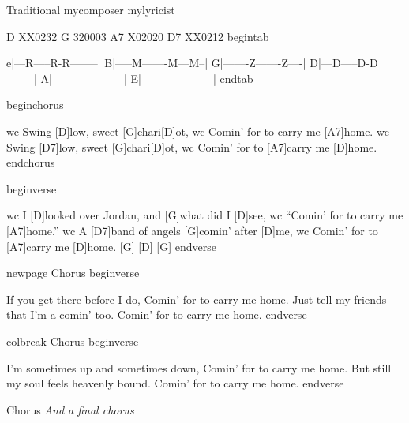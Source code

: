 
Traditional
mycomposer
mylyricist

D XX0232
G 320003
A7 X02020
D7 XX0212
begintab

e|---R-----R-R--------|
B|-----M-------M---M--|
G|-------Z-------Z----|
D|---D-----D-D--------|
A|--------------------|
E|--------------------|
endtab

beginchorus

wc Swing [D]low, sweet [G]chari[D]ot,
wc Comin{\textquoteright} for to carry me [A7]home.
wc Swing [D7]low, sweet [G]chari[D]ot,
wc Comin{\textquoteright} for to [A7]carry me [D]home.
endchorus

beginverse

wc I [D]looked over Jordan, and [G]what did I [D]see,
wc    {\textquotedblleft}Comin{\textquoteright} for to carry me [A7]home.{\textquotedblright}
wc A [D7]band of angels [G]comin{\textquoteright} after [D]me,
wc    Comin{\textquoteright} for to [A7]carry me [D]home.     [G]     [D]     [G]
endverse

newpage
Chorus
beginverse

If you get there before I do,
   Comin{\textquoteright} for to carry me home.
Just tell my friends that I{\textquoteright}m a comin{\textquoteright} too.
   Comin{\textquoteright} for to carry me home.
endverse

colbreak
Chorus
beginverse

I{\textquoteright}m sometimes up and sometimes down,
   Comin{\textquoteright} for to carry me home.
But still my soul feels heavenly bound.
   Comin{\textquoteright} for to carry me home.
endverse

Chorus
\textit{And a final chorus}
